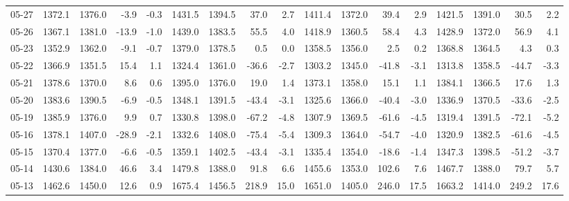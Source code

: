 \begin{threeparttable}
{\begin{tabular}{lrrrrrrrrrrrrrrrr}
  05-27 & 1372.1 & 1376.0 &       -3.9 &           -0.3 & 1431.5 & 1394.5 &       37.0 &            2.7 & 1411.4 & 1372.0 &       39.4 &            2.9 & 1421.5 & 1391.0 &        30.5 &              2.2 \\
  05-26 & 1367.1 & 1381.0 &      -13.9 &           -1.0 & 1439.0 & 1383.5 &       55.5 &            4.0 & 1418.9 & 1360.5 &       58.4 &            4.3 & 1428.9 & 1372.0 &        56.9 &              4.1 \\
  05-23 & 1352.9 & 1362.0 &       -9.1 &           -0.7 & 1379.0 & 1378.5 &        0.5 &            0.0 & 1358.5 & 1356.0 &        2.5 &            0.2 & 1368.8 & 1364.5 &         4.3 &              0.3 \\
  05-22 & 1366.9 & 1351.5 &       15.4 &            1.1 & 1324.4 & 1361.0 &      -36.6 &           -2.7 & 1303.2 & 1345.0 &      -41.8 &           -3.1 & 1313.8 & 1358.5 &       -44.7 &             -3.3 \\
  05-21 & 1378.6 & 1370.0 &        8.6 &            0.6 & 1395.0 & 1376.0 &       19.0 &            1.4 & 1373.1 & 1358.0 &       15.1 &            1.1 & 1384.1 & 1366.5 &        17.6 &              1.3 \\
  05-20 & 1383.6 & 1390.5 &       -6.9 &           -0.5 & 1348.1 & 1391.5 &      -43.4 &           -3.1 & 1325.6 & 1366.0 &      -40.4 &           -3.0 & 1336.9 & 1370.5 &       -33.6 &             -2.5 \\
  05-19 & 1385.9 & 1376.0 &        9.9 &            0.7 & 1330.8 & 1398.0 &      -67.2 &           -4.8 & 1307.9 & 1369.5 &      -61.6 &           -4.5 & 1319.4 & 1391.5 &       -72.1 &             -5.2 \\
  05-16 & 1378.1 & 1407.0 &      -28.9 &           -2.1 & 1332.6 & 1408.0 &      -75.4 &           -5.4 & 1309.3 & 1364.0 &      -54.7 &           -4.0 & 1320.9 & 1382.5 &       -61.6 &             -4.5 \\
  05-15 & 1370.4 & 1377.0 &       -6.6 &           -0.5 & 1359.1 & 1402.5 &      -43.4 &           -3.1 & 1335.4 & 1354.0 &      -18.6 &           -1.4 & 1347.3 & 1398.5 &       -51.2 &             -3.7 \\
  05-14 & 1430.6 & 1384.0 &       46.6 &            3.4 & 1479.8 & 1388.0 &       91.8 &            6.6 & 1455.6 & 1353.0 &      102.6 &            7.6 & 1467.7 & 1388.0 &        79.7 &              5.7 \\
  05-13 & 1462.6 & 1450.0 &       12.6 &            0.9 & 1675.4 & 1456.5 &      218.9 &           15.0 & 1651.0 & 1405.0 &      246.0 &           17.5 & 1663.2 & 1414.0 &       249.2 &             17.6 \\

\end{tabular}}
\end{threeparttable}
